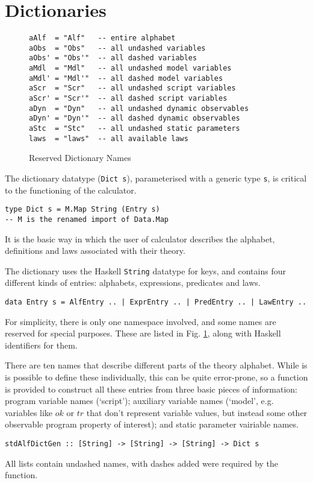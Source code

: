 \section{Dictionaries}\label{sec:Dictionaries}

\begin{figure}
  \centering
\begin{verbatim}
aAlf  = "Alf"   -- entire alphabet
aObs  = "Obs"   -- all undashed variables
aObs' = "Obs'"  -- all dashed variables
aMdl  = "Mdl"   -- all undashed model variables
aMdl' = "Mdl'"  -- all dashed model variables
aScr  = "Scr"   -- all undashed script variables
aScr' = "Scr'"  -- all dashed script variables
aDyn  = "Dyn"   -- all undashed dynamic observables
aDyn' = "Dyn'"  -- all dashed dynamic observables
aStc  = "Stc"   -- all undashed static parameters
laws  = "laws"  -- all available laws
\end{verbatim}
  \caption{Reserved Dictionary Names}\label{fig:rsvd-names}
\end{figure}

The dictionary datatype (\texttt{Dict s}), 
parameterised with a generic type \texttt{s},
is critical to the functioning of the calculator.
\begin{verbatim}
type Dict s = M.Map String (Entry s)
-- M is the renamed import of Data.Map
\end{verbatim}
It is the basic way in which the user of calculator
describes the alphabet, definitions and laws associated with their theory.

The dictionary uses the Haskell \texttt{String} datatype for keys,
and contains four different kinds of entries: alphabets,
expressions, predicates and laws.
{\small
\begin{verbatim}
data Entry s = AlfEntry .. | ExprEntry .. | PredEntry .. | LawEntry ..
\end{verbatim}
}
For simplicity, there is only one namespace involved,
and some names are reserved for special purposes.
These are listed in Fig. \ref{fig:rsvd-names},
along with Haskell identifiers for them.

There are ten names that describe different
parts of the theory alphabet.
While is is possible to define these individually,
this can be quite error-prone,
so a function is provided to construct all these entries
from three basic pieces of information:
program variable names (`script');
auxiliary variable names (`model',
e.g. variables like $ok$ or $tr$ that don't represent variable values,
but instead some other observable program property of interest);
and static parameter vairiable names. 
\begin{verbatim}
stdAlfDictGen :: [String] -> [String] -> [String] -> Dict s
\end{verbatim}
All lists contain undashed names, with dashes added were required
by the function.

